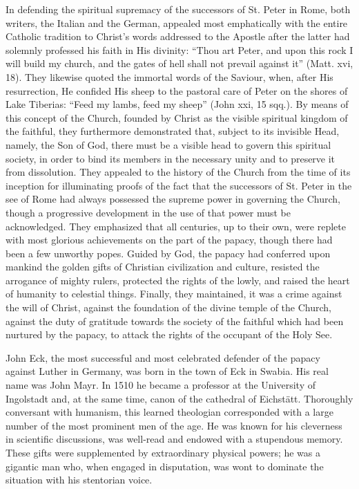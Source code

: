 In defending the spiritual supremacy of the successors of St. Peter
in Rome, both writers, the Italian and the German, appealed most
emphatically with the entire Catholic tradition to Christ’s words addressed
to the Apostle after the latter had solemnly professed his faith
in His divinity: “Thou art Peter, and upon this rock I will build my
church, and the gates of hell shall not prevail against it” (Matt. xvi,
18). They likewise quoted the immortal words of the Saviour, when,
after His resurrection, He confided His sheep to the pastoral care of
Peter on the shores of Lake Tiberias: ``Feed my lambs, feed my sheep''
(John xxi, 15 sqq.). By means of this concept of the Church, founded
by Christ as the visible spiritual kingdom of the faithful, they furthermore
demonstrated that, subject to its invisible Head, namely, the
Son of God, there must be a visible head to govern this spiritual society,
in order to bind its members in the necessary unity and to preserve
it from dissolution. They appealed to the history of the Church
from the time of its inception for illuminating proofs of the fact that
the successors of St. Peter in the see of Rome had always possessed the
supreme power in governing the Church, though a progressive
development in the use of that power must be acknowledged. They
emphasized that all centuries, up to their own, were replete with most
glorious achievements on the part of the papacy, though there had
been a few unworthy popes. Guided by God, the papacy had conferred
upon mankind the golden gifts of Christian civilization and culture,
resisted the arrogance of mighty rulers, protected the rights of the
lowly, and raised the heart of humanity to celestial things. Finally,
they maintained, it was a crime against the will of Christ, against the
foundation of the divine temple of the Church, against the duty of
gratitude towards the society of the faithful which had been
nurtured by the papacy, to attack the rights of the occupant
of the Holy
See.

John Eck, the most successful and most celebrated defender of the
papacy against Luther in Germany, was born in the town of Eck in
Swabia. His real name was John Mayr. In 1510 he became a professor
at the University of Ingolstadt and, at the same time, canon of the
cathedral of Eichstätt. Thoroughly conversant with humanism, this
learned theologian corresponded with a large number of the most
prominent men of the age. He was known for his cleverness in
scientific discussions, was well-read and endowed with a stupendous
memory. These gifts were supplemented by extraordinary physical
powers; he was a gigantic man who, when engaged in disputation,
was wont to dominate the situation with his stentorian voice.

